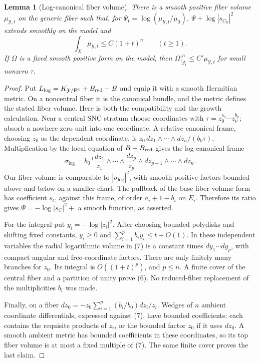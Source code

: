 \documentclass[11pt]{article}
\newtheorem{lemma}[theorem]{Lemma}
\begin{document}
\begin{lemma}[Log-canonical fiber volume]
There is a smooth positive fiber volume $\mu_{\mathcal Y,t}$ on the
generic fiber such that, for
$\Psi_t=\log(\mu_{\mathcal Y,t}/\mu_0)$,
$\Psi+\log|s_{C_{\mathcal Y}}|^2$ extends smoothly on the model and
\[
 \int_X\mu_{\mathcal Y,t}\leq C(1+t)^n\qquad(t\geq1).       \tag{6}
\]
If $\Omega$ is a fixed smooth positive form on the model, then
$\Omega|_{\mathcal Y_t}^n\leq C'\mu_{\mathcal Y,t}$ for small
nonzero $\tau$.
\end{lemma}
\begin{proof}
Put $L_{\log}=K_{\mathcal Y/\mathbf P^1}+B_{\rm red}-B$ and
equip it with a smooth Hermitian metric. On a noncentral fiber it is
the canonical bundle, and the metric defines the stated fiber volume.
Here is both the compatibility and the growth calculation.
Near a central SNC stratum choose coordinates with
$\tau=z_0^{b_0}\cdots z_p^{b_p}$; absorb a nowhere zero unit into
one coordinate. A relative canonical frame, choosing $z_0$ as the
dependent coordinate, is
$z_0\,dz_1\wedge\cdots\wedge dz_n/(b_0\tau)$.
Multiplication by the local equation of $B-B_{\rm red}$ gives the
log-canonical frame
\[
 \sigma_{\log}=b_0^{-1}
      \frac{dz_1}{z_1}\wedge\cdots\wedge\frac{dz_p}{z_p}
                    \wedge dz_{p+1}\wedge\cdots\wedge dz_n.
                                                               \tag{7}
\]
Our fiber volume is comparable to $|\sigma_{\log}|^2$, with smooth
positive factors bounded above and below on a smaller chart.
The pullback of the base fiber volume form has coefficient
$s_C$ against this frame, of order $a_i+1-b_i$ on $E_i$.
Therefore its ratio gives
$\Psi=-\log|s_C|^2+$ a smooth function, as asserted.

For the integral put $y_i=-\log|z_i|^2$. After choosing bounded
polydisks and shifting fixed constants, $y_i\geq0$ and
$\sum_{i=1}^p b_i y_i\leq t+O(1)$. In these independent variables
the radial logarithmic volume in (7) is a constant times
$dy_1\cdots dy_p$, with compact angular and free-coordinate factors.
There are only finitely many branches for $z_0$. Its integral is
$O((1+t)^p)$, and $p\leq n$. A finite cover of the central fiber
and a partition of unity prove (6). No reduced-fiber replacement
of the multiplicities $b_i$ was made.

Finally, on a fiber
$dz_0=-z_0\sum_{i=1}^p(b_i/b_0)dz_i/z_i$.
Wedges of $n$ ambient coordinate differentials, expressed against
(7), have bounded coefficients: each contains the requisite products
of $z_i$, or the bounded factor $z_0$ if it uses $dz_0$.
A smooth ambient metric has bounded coefficients in these coordinates,
so its top fiber volume is at most a fixed multiple of (7).
The same finite cover proves the last claim.
\end{proof}
\end{document}
